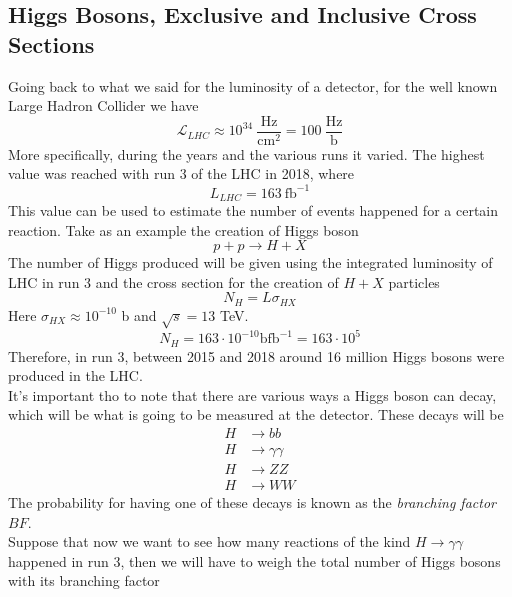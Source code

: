 \documentclass[../qm.tex]{subfiles}
\begin{document}
\subsection{Higgs Bosons, Exclusive and Inclusive Cross Sections}
Going back to what we said for the luminosity of a detector, for the well known Large Hadron Collider we have
\begin{equation*}
	\mathcal{L}_{LHC}\approx10^{34}\ \mathrm{\frac{Hz}{cm^{2}}}=100\ \mathrm{\frac{Hz}{b}}
\end{equation*}
More specifically, during the years and the various runs it varied. The highest value was reached with run 3 of the LHC in 2018, where
\begin{equation*}
	L_{LHC}=163\ \mathrm{fb^{-1}}
\end{equation*}
This value can be used to estimate the number of events happened for a certain reaction. Take as an example the creation of Higgs boson
\begin{equation*}
	p+p\to H+X
\end{equation*}
The number of Higgs produced will be given using the integrated luminosity of LHC in run 3 and the cross section for the creation of $H+X$ particles
\begin{equation*}
	N_H=L\sigma_{HX}
\end{equation*}
Here $\sigma_{HX}\approx10^{-10}$ b and $\sqrt{s}=13$ TeV.
\begin{equation*}
	N_H=163\cdot10^{-10}\mathrm{b fb^{-1}}=163\cdot10^5
\end{equation*}
Therefore, in run 3, between 2015 and 2018 around 16 million Higgs bosons were produced in the LHC.\\
It's important tho to note that there are various ways a Higgs boson can decay, which will be what is going to be measured at the detector. These decays will be
\begin{equation*}
	\begin{aligned}
		H&\to bb\\
		H&\to\gamma\gamma\\
		H&\to ZZ\\
		H&\to WW
	\end{aligned}
\end{equation*}
The probability for having one of these decays is known as the \emph{branching factor} $BF$.\\
Suppose that now we want to see how many reactions of the kind $H\to\gamma\gamma$ happened in run 3, then we will have to weigh the total number of Higgs bosons with its branching factor
\end{document}
